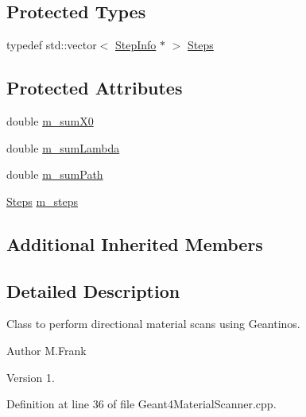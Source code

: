 \subsection*{Protected Types}
\begin{DoxyCompactItemize}
\item 
typedef std\+::vector$<$ \hyperlink{class_d_d4hep_1_1_simulation_1_1_geant4_material_scanner_1_1_step_info}{Step\+Info} $\ast$ $>$ \hyperlink{class_d_d4hep_1_1_simulation_1_1_geant4_material_scanner_af5f8938342c8e56e7db11a372b8d4d9c}{Steps}
\end{DoxyCompactItemize}
\subsection*{Protected Attributes}
\begin{DoxyCompactItemize}
\item 
double \hyperlink{class_d_d4hep_1_1_simulation_1_1_geant4_material_scanner_aa34c1dce75b345ef9586ad6f0cc24382}{m\+\_\+sum\+X0}
\item 
double \hyperlink{class_d_d4hep_1_1_simulation_1_1_geant4_material_scanner_a0632ba964c16dfa195aef83134e51430}{m\+\_\+sum\+Lambda}
\item 
double \hyperlink{class_d_d4hep_1_1_simulation_1_1_geant4_material_scanner_a2e04ec21c3f2d1800037e2dd427c8dc7}{m\+\_\+sum\+Path}
\item 
\hyperlink{class_d_d4hep_1_1_simulation_1_1_geant4_material_scanner_af5f8938342c8e56e7db11a372b8d4d9c}{Steps} \hyperlink{class_d_d4hep_1_1_simulation_1_1_geant4_material_scanner_aa8e97ed5d8812c6b4b4ceb0dce5f37d8}{m\+\_\+steps}
\end{DoxyCompactItemize}
\subsection*{Additional Inherited Members}


\subsection{Detailed Description}
Class to perform directional material scans using Geantinos. 

\begin{DoxyAuthor}{Author}
M.\+Frank 
\end{DoxyAuthor}
\begin{DoxyVersion}{Version}
1. 
\end{DoxyVersion}


Definition at line 36 of file Geant4\+Material\+Scanner.\+cpp.



